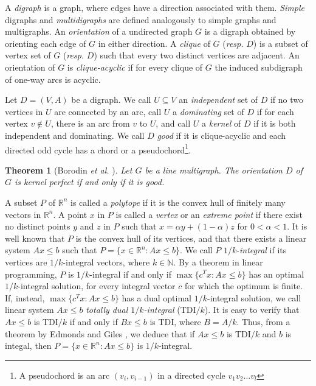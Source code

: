 \documentclass[11pt]{article}
\newtheorem{theorem}{Theorem}%
\numberwithin{theorem}{section}
\begin{document}
A \textit{digraph} is a graph, where edges have a direction associated with them. \textit{Simple} digraphs and \textit{multidigraphs} are defined analogously to simple graphs and multigraphs. An \textit{orientation} of a undirected graph $G$ is a digraph obtained by orienting each edge of $G$ in either direction. A \textit{clique} of $G$ (\textit{resp.} $D$) is a subset of vertex set of $G$ (\textit{resp.} $D$) such that every two distinct vertices are adjacent. An orientation of $G$ is \textit{clique-acyclic} if for every clique of $G$ the induced subdigraph of one-way arcs is acyclic. 
 
Let $D=(V,A)$ be a digraph. We call $U\subseteq V$ an \textit{independent} set of $D$ if no two vertices in $U$ are connected by an arc, call $U$ a \textit{dominating} set of $D$ if for each vertex $v\not\in U$, there is an arc from $v$ to $U$, and call $U$ a \textit{kernel} of $D$ if it is both independent and dominating. 
We call $D$ \textit{good} if it is clique-acyclic and each directed odd cycle has a chord or a pseudochord\footnote{A pseudochord is an arc $(v_i,v_{i-1})$ in a directed cycle $v_1 v_2\ldots v_l$}. 

\begin{theorem}[Borodin \textit{et al.} \cite{BoroKost98}]
\label{thm:BoroKost98}
Let $G$ be a line multigraph. The orientation $D$ of $G$ is kernel perfect if and only if it is good.
\end{theorem}

A subset $P$ of $\mathbb{R}^n$ is called a \textit{polytope} if it is the convex hull of finitely many vectors in $\mathbb{R}^n$. A point $x$ in $P$ is called a \textit{vertex} or an \textit{extreme point} if there exist no distinct points $y$ and $z$ in $P$ such that $x=\alpha y+ (1-\alpha)z$ for $0<\alpha<1$. It is well known that $P$ is the convex hull of its vertices, and that there exists a linear system $Ax\leq b$ such that $P=\{x\in\mathbb{R}^n:Ax\leq b\}$. We call $P$ $1/k$-\textit{integral} if its vertices are $1/k$-integral vectors, where $k\in\mathbb{N}$. By a theorem in linear programming, $P$ is $1/k$-integral if and only if $\max\{c^T x:Ax\leq b\}$ has an optimal $1/k$-integral solution, for every integral vector $c$ for which the optimum is finite. If, instead, $\max\{c^T x:Ax\leq b\}$ has a dual optimal $1/k$-integral solution, we call linear system $Ax\leq b$ \textit{totally dual $1/k$-integral} (TDI$/k$).
It is easy to verify that $Ax\leq b$ is TDI$/k$ if and only if $Bx\leq b$ is TDI, where $B=A/k$. Thus, from a theorem by Edmonds and Giles \cite{EdmoGile77}, we deduce that if $Ax\leq b$ is TDI$/k$ and $b$ is integal, then $P=\{x\in\mathbb{R}^n:Ax\leq b\}$ is $1/k$-integral.
\end{document}
